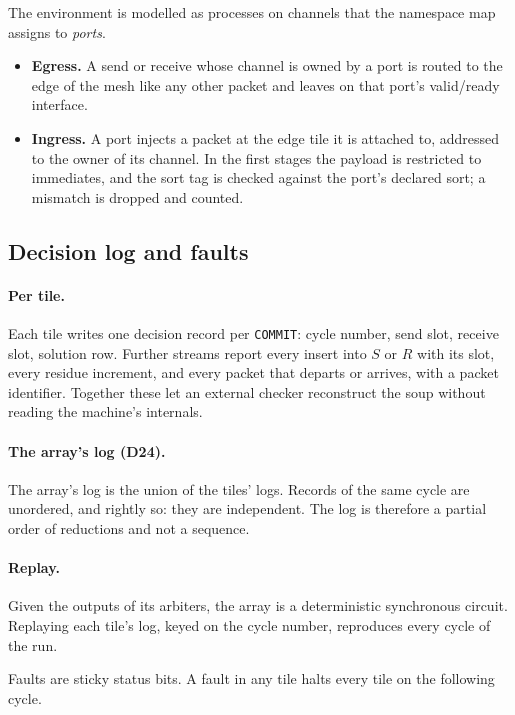 \documentclass[10.5pt,a4paper]{extarticle}
\newcommand{\kw}[1]{\texttt{#1}}
\newcommand{\dec}[1]{\textbf{D#1}}
\theoremstyle{definition}
\theoremstyle{remark}
\begin{document}
The environment is modelled as processes on channels that the namespace map
assigns to \emph{ports}.
\begin{itemize}
\item \textbf{Egress.} A send or receive whose channel is owned by a port is
routed to the edge of the mesh like any other packet and leaves on that
port's valid/ready interface.
\item \textbf{Ingress.} A port injects a packet at the edge tile it is
attached to, addressed to the owner of its channel. In the first stages the
payload is restricted to immediates, and the sort tag is checked against the
port's declared sort; a mismatch is dropped and counted.
\end{itemize}

\subsection{Decision log and faults}\label{sec:log}

\paragraph{Per tile.} Each tile writes one decision record per \kw{COMMIT}:
cycle number, send slot, receive slot, solution row. Further streams report
every insert into $S$ or $R$ with its slot, every residue increment, and
every packet that departs or arrives, with a packet identifier. Together
these let an external checker reconstruct the soup without reading the
machine's internals.

\paragraph{The array's log (\dec{24}).} The array's log is the union of the
tiles' logs. Records of the same cycle are unordered, and rightly so: they
are independent. The log is therefore a partial order of reductions and not
a sequence.

\paragraph{Replay.} Given the outputs of its arbiters, the array is a
deterministic synchronous circuit. Replaying each tile's log, keyed on the
cycle number, reproduces every cycle of the run.

Faults are sticky status bits. A fault in any tile halts every tile on the
following cycle.
\end{document}
